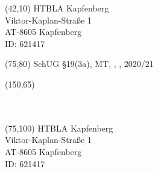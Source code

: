 \documentclass [8pt]{article}
\begin{document}
\pagestyle{empty}

{
\begin{textblock}{55}(42,10)
HTBLA Kapfenberg\\
Viktor-Kaplan-Straße 1\\
AT-8605 Kapfenberg\\
ID: 621417
\end{textblock}


\begin{textblock}{60}(75,80)
SchUG §19(3a), MT, \Klasse, \Schuler, 2020/21
\end{textblock}

\begin{textblock}{45}(150,65)
\AddrA\\
\AddrB\\
\AddrC\\
\AddrD
\end{textblock}


\begin{textblock}{55}(75,100)
HTBLA Kapfenberg\\
Viktor-Kaplan-Straße 1\\
AT-8605 Kapfenberg\\
ID: 621417
\end{textblock}


\newpage
}
\end{document}
